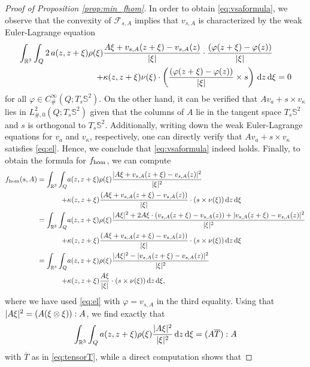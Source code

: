 \documentclass[reqno,11pt]{amsart}
\numberwithin{equation}{section}
\theoremstyle{thmlemcorr}
\numberwithin{theorem}{section}
\theoremstyle{thmlemcorr*}
\theoremstyle{defi}
\theoremstyle{remexample}
\theoremstyle{ass}
\newcommand{\R}{\mathbb{R}}
\renewcommand{\S}{\mathbb{S}}
\newcommand{\Fcal}{\mathcal{F}}
\newcommand{\dd}{\,\mathrm{d}}
\DeclarePairedDelimiter{\abs}{\lvert}{\rvert}
\newcommand{\1}{\mathds{1}}
\begin{document}
\begin{proof}[Proof of Proposition \ref{prop:min_fhom}]
    In order to obtain \eqref{eq:vsaformula}, we observe that the convexity of $\Fcal_{s,A}$ implies that $v_{s,A}$ is characterized by the weak Euler-Lagrange equation 
    \begin{align}
    \begin{split}\label{eq:el}
        \int_{\R^3}\int_{Q}2 \,a(z,z+\xi)\rho(\xi)&\frac{A\xi+v_{s,A}(z+\xi)-v_{s,A}(z)}{\abs{\xi}}\cdot \frac{(\varphi(z+\xi)-\varphi(z))}{\abs{\xi}}\\
        +&\kappa(z,z+\xi)\nu(\xi)\cdot \left(\frac{(\varphi(z+\xi)-\varphi(z))}{\abs{\xi}} \times s\right)\dd z\dd \xi=0
        \end{split}
    \end{align}
    for all $\varphi \in C_{\#}^{\infty}(Q;T_s\S^2)$. On the other hand, it can be verified that $Av_a+ s \times v_\kappa$ lies in $L^2_{\#,0}(Q;T_s\S^2)$ given that the columns of $A$ lie in the tangent space $T_s\S^2$ and $s$ is orthogonal to $T_s\S^2$. Additionally, writing down the weak Euler-Lagrange equations for $v_a$ and $v_\kappa$, respectively, one can directly verify that $Av_a+s \times v_\kappa$ satisfies \eqref{eq:el}. Hence, we conclude that \eqref{eq:vsaformula} indeed holds. Finally, to obtain the formula for $f_{\rm hom}$, we can compute
    \begin{align*}
        f_{\rm hom}(s,A)= \int_{\R^3}\int_{Q}&a(z,z+\xi)\rho(\xi)\frac{|A\xi +v_{s,A}(z+\xi)-v_{s,A}(z)|^2}{|\xi|^2}\\
+&\kappa(z,z+\xi)\frac{(A\xi+v_{s,A}(z+\xi)-v_{s,A}(z))}{|\xi|} \cdot(s \times \nu(\xi)) \dd z\dd \xi\\
= \int_{\R^3}\int_{Q}&a(z,z+\xi)\rho(\xi)\frac{|A\xi|^2 +2A\xi \cdot (v_{s,A}(z+\xi)-v_{s,A}(z))+|v_{s,A}(z+\xi)-v_{s,A}(z)|^2}{|\xi|^2}\\
+&\kappa(z,z+\xi)\frac{(A\xi+v_{s,A}(z+\xi)-v_{s,A}(z))}{|\xi|} \cdot(s \times \nu(\xi)) \dd z\dd \xi\\
= \int_{\R^3}\int_{Q}&a(z,z+\xi)\rho(\xi)\frac{|A\xi|^2 -|v_{s,A}(z+\xi)-v_{s,A}(z)|^2}{|\xi|^2}\\
+&\kappa(z,z+\xi)\frac{A\xi}{|\xi|} \cdot(s \times \nu(\xi))\dd z\dd \xi,
    \end{align*}
    where we have used \eqref{eq:el} with $\varphi = v_{s,A}$ in the third equality.  Using that $\abs{A\xi}^2=(A(\xi\otimes\xi)):A$, we find exactly that 
    \[
    \int_{\R^3}\int_{Q}a(z,z+\xi)\rho(\xi)\frac{\abs{A\xi}^2}{\abs{\xi}^2}\dd z\dd \xi = (A\overline{T}):A
    \]
    with $\overline{T}$ as in \eqref{eq:tensorT}, while a direct computation shows that

\end{proof}
\end{document}
